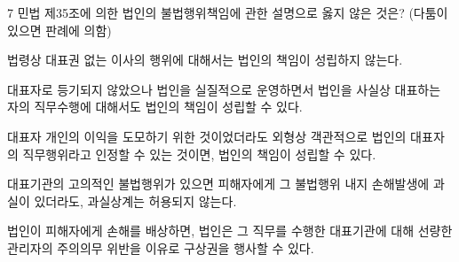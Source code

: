 \begin{question}{7}
민법 제35조에 의한 법인의 불법행위책임에 관한 설명으로 옳지 않은 것은? (다툼이 있으면 판례에 의함)
\begin{choices}
  \item 법령상 대표권 없는 이사의 행위에 대해서는 법인의 책임이 성립하지 않는다.
  \item 대표자로 등기되지 않았으나 법인을 실질적으로 운영하면서 법인을 사실상 대표하는 자의 직무수행에 대해서도 법인의 책임이 성립할 수 있다.
  \item 대표자 개인의 이익을 도모하기 위한 것이었더라도 외형상 객관적으로 법인의 대표자의 직무행위라고 인정할 수 있는 것이면, 법인의 책임이 성립할 수 있다.
  \item 대표기관의 고의적인 불법행위가 있으면 피해자에게 그 불법행위 내지 손해발생에 과실이 있더라도, 과실상계는 허용되지 않는다.
  \item 법인이 피해자에게 손해를 배상하면, 법인은 그 직무를 수행한 대표기관에 대해 선량한 관리자의 주의의무 위반을 이유로 구상권을 행사할 수 있다.
\end{choices}
\end{question}
